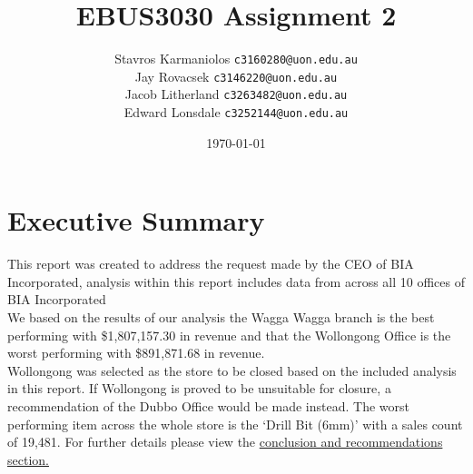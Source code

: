 \documentclass{article}
\title{EBUS3030 Assignment 2}
\author{
        Stavros Karmaniolos 
        \texttt{c3160280@uon.edu.au}\\
        Jay Rovacsek
        \texttt{c3146220@uon.edu.au}\\
        Jacob Litherland
        \texttt{c3263482@uon.edu.au}\\
        Edward Lonsdale
        \texttt{c3252144@uon.edu.au}
    }
\date{\today}
\newcommand\backgroundimage{
        \put(-5,0){
        \parbox[b][\paperheight]{\paperwidth}{
        \vfill
        \centering
        \vfill
    }}}
\begin{document}
    \lstset{style=sql}
    \AddToShipoutPicture{\backgroundimage}

    \begin{titlingpage}
        \maketitle
    \end{titlingpage}

    \tableofcontents

\newpage
    

    
    


    \section{Executive Summary}
    \label{sec:Executive Summary}
    This report was created to address the request made by the CEO of BIA Incorporated,
    analysis within this report includes data from across all 10 offices of BIA Incorporated \\
    
    We based on the results of our analysis the Wagga Wagga branch is the best performing with 
    \$1,807,157.30 in revenue and that the Wollongong Office is the worst performing with 
    \$891,871.68 in revenue. \\
    
    Wollongong was selected as the store to be closed based on the included analysis in this 
    report.
    If Wollongong is proved to be unsuitable for closure, a recommendation of the Dubbo Office 
    would be made instead.
    The worst performing item across the whole store is the ‘Drill Bit (6mm)’ 
    with a sales count of 19,481. For further details please view the \hyperref[sec:Conclusion]{\color{blue}conclusion and recommendations section.}
    
\end{document}
